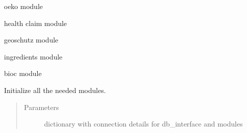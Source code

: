 \documentclass[letterpaper,10pt,english]{sphinxmanual}
\begin{document}
\begin{fulllineitems}
\begin{fulllineitems}
\end{fulllineitems}


\begin{fulllineitems}
\label{\detokenize{api:worker.Worker.oeko}}
oeko module

\end{fulllineitems}


\begin{fulllineitems}
\label{\detokenize{api:worker.Worker.health}}
health claim module

\end{fulllineitems}


\begin{fulllineitems}
\label{\detokenize{api:worker.Worker.geo}}
geoschutz module

\end{fulllineitems}


\begin{fulllineitems}
\label{\detokenize{api:worker.Worker.ingr}}
ingredients module

\end{fulllineitems}


\begin{fulllineitems}
\label{\detokenize{api:worker.Worker.bioc}}
bioc module

\end{fulllineitems}


\begin{fulllineitems}
\label{\detokenize{api:worker.Worker.__init__}}
Initialize all the needed modules.
\begin{quote}\begin{description}
\item[{Parameters}] \leavevmode
{} \textendash{} dictionary with connection details for db\_interface
and modules


\end{description}
\end{quote}
\end{fulllineitems}
\end{fulllineitems}
\end{document}
